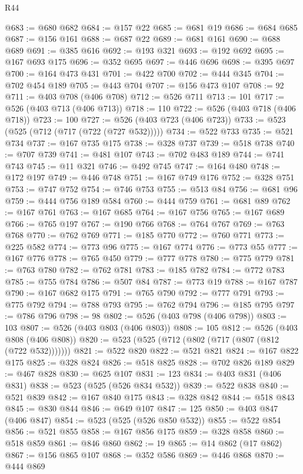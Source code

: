 \begin{lexlean}{R44}
\begin{coremodule}
@683 := @680 @682
@684 := @157 @22
@685 := @681 @19
@686 := @684 @685
@687 := @156 @161
@688 := @687 @22
@689 := @681 @161
@690 := @688 @689
@691 := @385 @616
@692 := @193 @321
@693 := @192 @692
@695 := @167 @693 @175
@696 := @352 @695
@697 := @446 @696
@698 := @395 @697
@700 := @164 @473 @431
@701 := @422 @700
@702 := @444 @345
@704 := @702 @454 @189
@705 := @443 @704
@707 := @156 @473 @107
@708 := 92
@711 := @403 @708 (@406 @708)
@712 := @526 @711
@713 := 101
@717 := @526 (@403 @713 (@406 @713))
@718 := 110
@722 := @526 (@403 @718 (@406 @718))
@723 := 100
@727 := @526 (@403 @723 (@406 @723))
@733 := @523 (@525 (@712 (@717 (@722 (@727 @532)))))
@734 := @522 @733
@735 := @521 @734
@737 := @167 @735 @175
@738 := @328 @737
@739 := @518 @738
@740 := @707 @739
@741 := @481 @107
@743 := @702 @483 @189
@744 := @741 @743
@745 := @11 @321
@746 := @492 @745
@747 := @164 @480
@748 := @172 @197
@749 := @446 @748
@751 := @167 @749 @176
@752 := @328 @751
@753 := @747 @752
@754 := @746 @753
@755 := @513 @84
@756 := @681 @96
@759 := @444 @756 @189 @584
@760 := @444 @759
@761 := @681 @89
@762 := @167 @761
@763 := @167 @685
@764 := @167 @756
@765 := @167 @689
@766 := @765 @197
@767 := @190 @766
@768 := @764 @767
@769 := @763 @768
@770 := @762 @769
@771 := @185 @770
@772 := @760 @771
@773 := @225 @582
@774 := @773 @96
@775 := @167 @774
@776 := @773 @55
@777 := @167 @776
@778 := @765 @450
@779 := @777 @778
@780 := @775 @779
@781 := @763 @780
@782 := @762 @781
@783 := @185 @782
@784 := @772 @783
@785 := @755 @784
@786 := @507 @84
@787 := @773 @19
@788 := @167 @787
@790 := @167 @682 @175
@791 := @765 @790
@792 := @777 @791
@793 := @775 @792
@794 := @788 @793
@795 := @762 @794
@796 := @185 @795
@797 := @786 @796
@798 := 98
@802 := @526 (@403 @798 (@406 @798))
@803 := 103
@807 := @526 (@403 @803 (@406 @803))
@808 := 105
@812 := @526 (@403 @808 (@406 @808))
@820 := @523 (@525 (@712 (@802 (@717 (@807 (@812 (@722 @532)))))))
@821 := @522 @820
@822 := @521 @821
@824 := @167 @822 @175
@825 := @328 @824
@826 := @518 @825
@828 := @702 @826 @189
@829 := @467 @828
@830 := @625 @107
@831 := 123
@834 := @403 @831 (@406 @831)
@838 := @523 (@525 (@526 @834 @532))
@839 := @522 @838
@840 := @521 @839
@842 := @167 @840 @175
@843 := @328 @842
@844 := @518 @843
@845 := @830 @844
@846 := @649 @107
@847 := 125
@850 := @403 @847 (@406 @847)
@854 := @523 (@525 (@526 @850 @532))
@855 := @522 @854
@856 := @521 @855
@858 := @167 @856 @175
@859 := @328 @858
@860 := @518 @859
@861 := @846 @860
@862 := 19
@865 := @14 @862 (@17 @862)
@867 := @156 @865 @107
@868 := @352 @586
@869 := @446 @868
@870 := @444 @869

\end{coremodule}
\end{lexlean}

